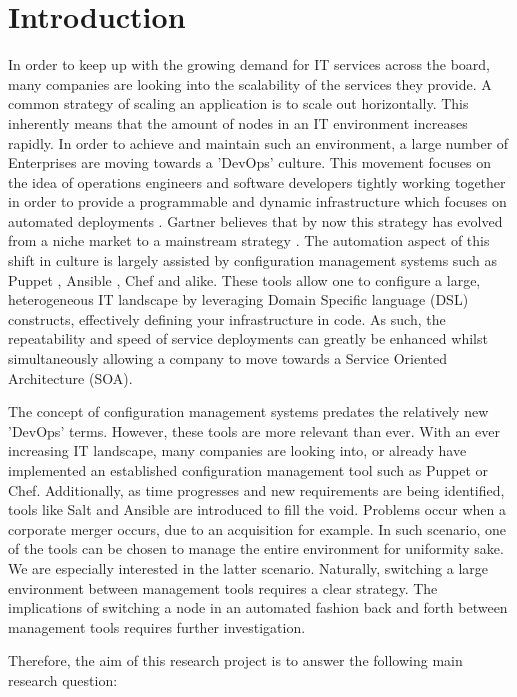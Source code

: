 \section{Introduction}\label{sec:introduction}
In order to keep up with the growing demand for IT services across the board, many companies are looking into the scalability of the services they provide. A common strategy of scaling an application is to scale out horizontally. This inherently means that the amount of nodes in an IT environment increases rapidly. In order to achieve and maintain such an environment, a large number of Enterprises are moving towards a 'DevOps' culture. This movement focuses on the idea of operations engineers and software developers tightly working together in order to provide a programmable and dynamic infrastructure which focuses on automated deployments \cite{loukides_2012}. Gartner believes that by now this strategy has evolved from a niche market to a mainstream strategy \cite{gartner_2015}. The automation aspect of this shift in culture is largely assisted by configuration management systems such as Puppet \cite{whatispuppet}, Ansible \cite{whatisansible}, Chef \cite{whatischef} and alike. These tools allow one to configure a large, heterogeneous IT landscape by leveraging Domain Specific language (DSL)  constructs, effectively defining your infrastructure in code. As such, the repeatability and speed of service deployments can greatly be enhanced whilst simultaneously allowing a company to move towards a Service Oriented Architecture (SOA).

The concept of configuration management systems predates the relatively new 'DevOps' terms. However, these tools are more relevant than ever. With an ever increasing IT landscape, many companies are looking into, or already have implemented an established configuration management tool such as Puppet or Chef. Additionally, as time progresses and new requirements are being identified, tools like Salt and Ansible are introduced to fill the void. Problems occur when a corporate merger occurs, due to an acquisition for example. In such scenario, one of the tools can be chosen to manage the entire environment for uniformity sake. We are especially interested in the latter scenario. Naturally, switching a large environment between management tools requires a clear strategy. The implications of switching a node in an automated fashion back and forth between management tools requires further investigation. 

Therefore, the aim of this research project is to answer the following main research question:

